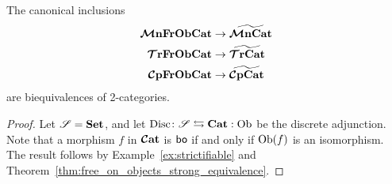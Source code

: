 \documentclass[11pt,oneside,article]{memoir}
\begin{document}
\begin{corollary}
      \label{cor:object_frees}
   The canonical inclusions
   \begin{align*}
      \bm{\mathcal{M}}\mathbf{nFrObCat} &\to \widetilde{\bm{\mathcal{M}}\mathbf{nCat}} \\
      \bm{\mathcal{T}}\mathbf{rFrObCat} &\to \widetilde{\bm{\mathcal{T}}\mathbf{rCat}} \\
      \bm{\mathcal{C}}\mathbf{pFrObCat} &\to \widetilde{\bm{\mathcal{C}}\mathbf{pCat}}
   \end{align*}
   are biequivalences of 2-categories.
\end{corollary}
\begin{proof}
   Let $\mathscr{S}=\mathbf{Set}$, and let $\mathrm{Disc}\colon\mathscr{S}\leftrightarrows\mathbf{Cat}:\mathrm{Ob}$ be the discrete
   adjunction. Note that a morphism $f$ in $\bm{\mathcal{C}}\mathbf{at}$ is $\mathsf{bo}$ if and only if $\mathrm{Ob}(f)$ is an
   isomorphism. The result follows by Example~\ref{ex:strictifiable} and
   Theorem~\ref{thm:free_on_objects_strong_equivalence}.
\end{proof}
\end{document}
